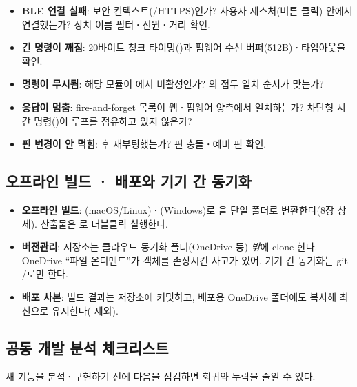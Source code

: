 \begin{infobox}[title=흔한 실패 지점과 점검 순서]
\begin{itemize}
  \item \textbf{BLE 연결 실패}: 보안 컨텍스트(/HTTPS)인가? 사용자
        제스처(버튼 클릭) 안에서 연결했는가? 장치 이름 필터\textbf{·}전원\textbf{·}거리 확인.
  \item \textbf{긴 명령이 깨짐}: 20바이트 청크 타이밍()과 펌웨어
        수신 버퍼(512B)\textbf{·}타임아웃을 확인.
  \item \textbf{명령이 무시됨}: 해당 모듈이 에서 비활성인가?
        의 접두 일치 순서가 맞는가?
  \item \textbf{응답이 멈춤}: fire-and-forget 목록이 웹\textbf{·}펌웨어 양측에서 일치하는가?
        차단형 시간 명령()이 루프를 점유하고 있지 않은가?
  \item \textbf{핀 변경이 안 먹힘}:  후 재부팅했는가? 핀 충돌\textbf{·}예비 핀 확인.
\end{itemize}
\end{infobox}

\subsection{오프라인 빌드 \textbf{·} 배포와 기기 간 동기화}

\begin{itemize}
  \item \textbf{오프라인 빌드}: (macOS/Linux)\textbf{·}(Windows)로
        을  단일 폴더로 변환한다(8장 상세). 산출물은
        로 더블클릭 실행한다.
  \item \textbf{버전관리}: 저장소는 클라우드 동기화 폴더(OneDrive 등) \emph{밖}에 clone 한다.
        OneDrive ``파일 온디맨드''가  객체를 손상시킨 사고가 있어, 기기 간
        동기화는 git /로만 한다.
  \item \textbf{배포 사본}: 빌드 결과는 저장소에 커밋하고, 배포용 OneDrive
         폴더에도 복사해 최신으로 유지한다( 제외).
\end{itemize}

\subsection{공동 개발 분석 체크리스트}

새 기능을 분석\textbf{·}구현하기 전에 다음을 점검하면 회귀와 누락을 줄일 수 있다.

